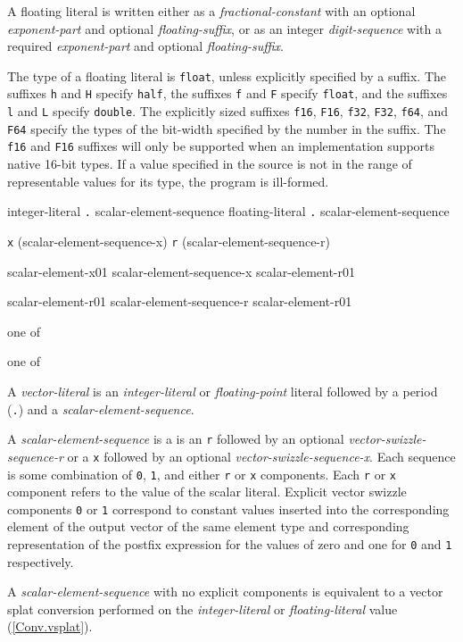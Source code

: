 \p A floating literal is written either as a \textit{fractional-constant} with
an optional \textit{exponent-part} and optional \textit{floating-suffix}, or as
an integer \textit{digit-sequence} with a required \textit{exponent-part} and
optional \textit{floating-suffix}.

\p The type of a floating literal is \texttt{float}, unless explicitly specified
by a suffix. The suffixes \texttt{h} and \texttt{H} specify \texttt{half}, the
suffixes \texttt{f} and \texttt{F} specify \texttt{float}, and the suffixes
\texttt{l} and \texttt{L} specify \texttt{double}. The explicitly sized suffixes
\texttt{f16}, \texttt{F16}, \texttt{f32}, \texttt{F32}, \texttt{f64}, and
\texttt{F64} specify the types of the bit-width specified by the number in the
suffix. The \texttt{f16} and \texttt{F16} suffixes will only be supported when
an implementation supports native 16-bit types. If a value specified in the
source is not in the range of representable values for its type, the program is
ill-formed.


\begin{grammar}
  \br
  integer-literal \texttt{.} scalar-element-sequence\br
  floating-literal \texttt{.} scalar-element-sequence

  \br
  \texttt{x} \opt(scalar-element-sequence-x)\br
  \texttt{r} \opt(scalar-element-sequence-r)\br

  \br
  scalar-element-x01\br
  scalar-element-sequence-x scalar-element-r01\br

  \br
  scalar-element-r01\br
  scalar-element-sequence-r scalar-element-r01\br

   \textnormal{one of}\br
  \br

   \textnormal{one of}\br
  \br

\end{grammar}

\p A \textit{vector-literal} is an \textit{integer-literal} or
\textit{floating-point} literal followed by a period (\texttt{.}) and a
\textit{scalar-element-sequence}.

\p A \textit{scalar-element-sequence} is a is an \texttt{r} followed by an
optional \textit{vector-swizzle-sequence-r} or a \texttt{x} followed by an
optional \textit{vector-swizzle-sequence-x}. Each sequence is some combination
of \texttt{0}, \texttt{1}, and either \texttt{r} or \texttt{x} components.
Each \texttt{r} or \texttt{x} component refers to the value of the scalar
literal. Explicit vector swizzle components \texttt{0} or \texttt{1} correspond
to constant values inserted into the corresponding element of the output vector
of the same element type and corresponding representation of the postfix
expression for the values of zero and one for \texttt{0} and \texttt{1}
respectively.

A \textit{scalar-element-sequence} with no explicit components is equivalent to
a vector splat conversion performed on the \textit{integer-literal} or
\textit{floating-literal} value (\ref{Conv.vsplat}).
